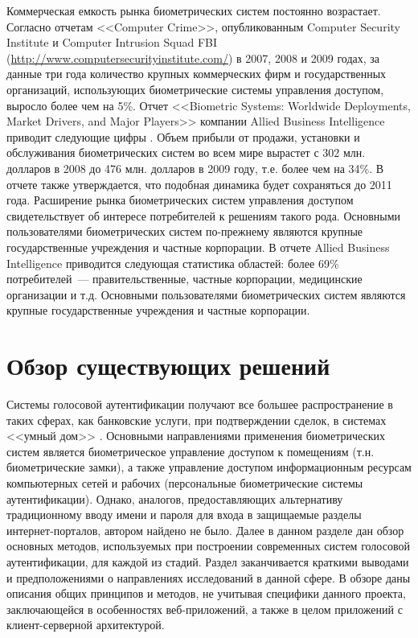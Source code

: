 Коммерческая емкость рынка биометрических систем постоянно возрастает. Согласно отчетам <<Computer Crime>>, опубликованным Computer Security Institute и Computer Intrusion Squad FBI (\url{http://www.computersecurityinstitute.com/}) в 2007, 2008 и 2009 годах, за данные три года количество крупных коммерческих фирм и государственных организаций, использующих биометрические системы управления доступом, выросло более чем на 5\%. Отчет <<Biometric Systems: Worldwide Deployments, Market Drivers, and Major Players>> компании Allied Business Intelligence приводит следующие цифры \cite{ABI02Trends}. Объем прибыли от продажи, установки и обслуживания биометрических систем во всем мире вырастет с 302 млн. долларов в 2008 до 476 млн. долларов в 2009 году, т.е. более чем на 34\%. В отчете также утверждается, что подобная динамика будет сохраняться до 2011 года. Расширение рынка биометрических систем управления доступом свидетельствует об интересе потребителей к решениям такого рода. Основными пользователями биометрических систем по-прежнему являются крупные государственные учреждения и частные корпорации. В отчете Allied Business Intelligence приводится следующая статистика областей: более 69\% потребителей~--- правительственные, частные корпорации, медицинские организации и т.д. Основными пользователями биометрических систем являются крупные государственные учреждения и частные корпорации.

\section{Обзор существующих решений}
\label{sec:overview}

Системы голосовой аутентификации получают все большее распространение в таких сферах, как банковские услуги, при подтверждении сделок, в системах <<умный дом>> \cite{ABI02Trends}. Основными направлениями применения биометрических систем является биометрическое управление доступом к помещениям (т.н. биометрические замки), а также управление доступом информационным ресурсам компьютерных сетей и рабочих (персональные биометрические системы аутентификации). Однако, аналогов, предоставляющих альтернативу традиционному вводу имени и пароля для входа в защищаемые разделы интернет-порталов, автором найдено не было. Далее в данном разделе дан обзор основных методов, используемых при построении современных систем голосовой аутентификации, для каждой из стадий. Раздел заканчивается краткими выводами и предположениями о направлениях исследований в данной сфере. В обзоре даны описания общих принципов и методов, не учитывая специфики данного проекта, заключающейся в особенностях веб-приложений, а также в целом приложений с клиент-серверной архитектурой.


